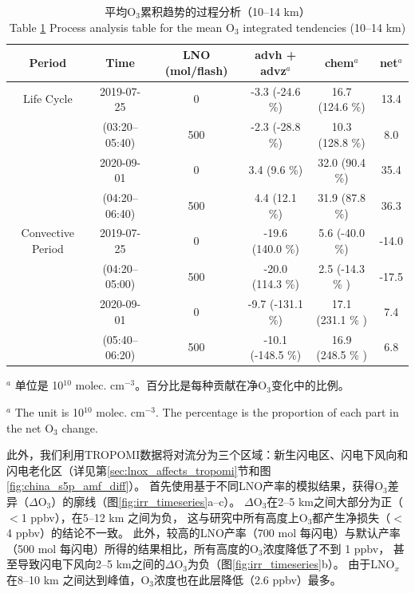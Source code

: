\begin{table}[h]
\centering
\caption{平均O$_3$累积趋势的过程分析（10--14 km）\\ Table \ref{table:ipr} Process analysis table for the mean O$_3$ integrated tendencies (10--14 km)}
\scriptsize
{\centering
\begin{tabular}{@{\extracolsep{\fill}} cccccc}
\hline
  Period           & Time             & LNO (mol/flash) & advh + advz$^a$       & chem$^a$              & net$^a$    \\
\hline
Life Cycle         & 2019-07-25       & 0               & -3.3 (-24.6 \%)        & 16.7 (124.6 \%)        & 13.4       \\
                   & (03:20--05:40)   & 500             & -2.3 (-28.8 \%)        & 10.3 (128.8 \%)        & 8.0        \\
\cline{2-6}
                   & 2020-09-01       & 0               & 3.4  (9.6 \%)          & 32.0 (90.4 \%)         & 35.4       \\
                   & (04:20--06:40)   & 500             & 4.4  (12.1 \%)         & 31.9 (87.8 \%)         & 36.3       \\
\hline
Convective Period   & 2019-07-25      & 0              & -19.6 (140.0 \%)       & 5.6 (-40.0 \%)         & -14.0      \\
                    & (04:20--05:00)  & 500            & -20.0 (114.3 \%)       & 2.5 (-14.3 \% )        & -17.5      \\
\cline{2-6}
                    & 2020-09-01      & 0              & -9.7  (-131.1 \%)      & 17.1 (231.1 \% )       & 7.4        \\
                    & (05:40--06:20)  & 500            & -10.1 (-148.5 \%)      & 16.9 (248.5 \% )       & 6.8        \\
\hline
\end{tabular}
\par }
\begin{tablenotes}
\footnotesize
\item $^{a}$ 单位是 10$^{10}$ molec. cm$^{-3}$。百分比是每种贡献在净O$_3$变化中的比例。 \\
\item $^{a}$ The unit is 10$^{10}$ molec. cm$^{-3}$. The percentage is the proportion of each part in the net O$_3$ change.
\end{tablenotes}
\label{table:ipr}
\end{table}


此外，我们利用TROPOMI数据将对流分为三个区域：新生闪电区、闪电下风向和闪电老化区（详见第\ref{sec:lnox_affects_tropomi}节和图\ref{fig:china_s5p_amf_diff}）。
首先使用基于不同LNO产率的模拟结果，获得O$_3$差异（$\Delta$O$_3$）的廓线（图\ref{fig:irr_timeseries}a--c）。
$\Delta$O$_3$在2--5 km之间大部分为正（$<$1 ppbv），在5--12 km 之间为负，
这与\citet{Ott.2007}研究中所有高度上O$_3$都产生净损失（$<$4 ppbv）的结论不一致。
此外，较高的LNO产率（700 mol 每闪电）与默认产率（500 mol 每闪电）所得的结果相比，所有高度的O$_3$浓度降低了不到 1 ppbv，
甚至导致闪电下风向2--5 km之间的$\Delta$O$_3$为负（图\ref{fig:irr_timeseries}b）。
由于LNO$_x$在8--10 km 之间达到峰值，O$_3$浓度也在此层降低（2.6 ppbv）最多。

